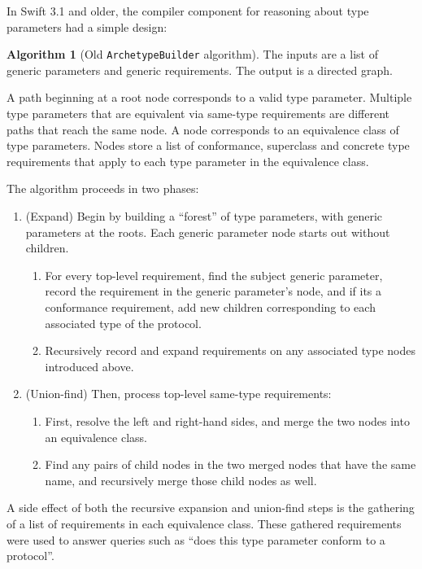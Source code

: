 \documentclass[a4paper,headsepline,bibliography=totoc,toc=flat,fleqn,twoside=semi]{scrbook}
\theoremstyle{definition}
\theoremstyle{definition}
\theoremstyle{definition}
\newtheorem{algorithm}{Algorithm}[chapter]
\begin{document}
In Swift 3.1 and older, the compiler component for reasoning about type parameters had a simple design:
\begin{algorithm}[Old \texttt{ArchetypeBuilder} algorithm]\label{archetypebuilder} The inputs are a list of generic parameters and generic requirements. The output is a directed graph.

A path beginning at a root node corresponds to a valid type parameter. Multiple type parameters that are equivalent via same-type requirements are different paths that reach the same node. A node corresponds to an equivalence class of type parameters. Nodes store a list of conformance, superclass and concrete type requirements that apply to each type parameter in the equivalence class.

The algorithm proceeds in two phases:
\begin{enumerate}
\item (Expand) Begin by building a ``forest'' of type parameters, with generic parameters at the roots. Each generic parameter node starts out without children.
\begin{enumerate}
\item For every top-level requirement, find the subject generic parameter, record the requirement in the generic parameter's node, and if its a conformance requirement, add new children corresponding to each associated type of the protocol.
\item Recursively record and expand requirements on any associated type nodes introduced above.
\end{enumerate}
\item (Union-find) Then, process top-level same-type requirements:
\begin{enumerate}
\item First, resolve the left and right-hand sides, and merge the two nodes into an equivalence class.
\item Find any pairs of child nodes in the two merged nodes that have the same name, and recursively merge those child nodes as well.
\end{enumerate}
\end{enumerate}
\end{algorithm}


A side effect of both the recursive expansion and union-find steps is the gathering of a list of requirements in each equivalence class. These gathered requirements were used to answer queries such as ``does this type parameter conform to a protocol''.
\end{document}
